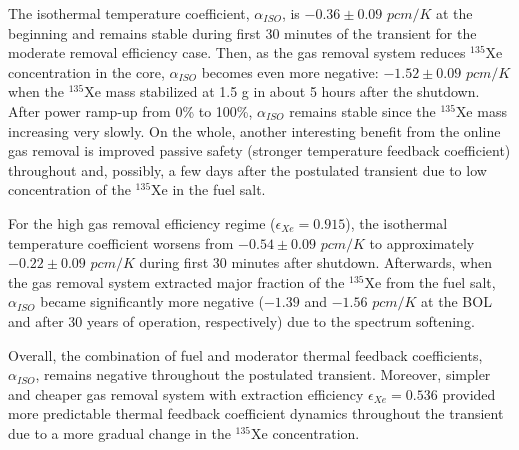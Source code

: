The isothermal temperature coefficient, $\alpha_{ISO}$, is $-0.36\pm0.09$ 
$pcm/K$ at the beginning and remains stable during first 30 minutes of the 
transient for the moderate removal efficiency case.  Then, as the gas removal 
system reduces $^{135}$Xe concentration in the core, $\alpha_{ISO}$ becomes 
even more negative: $-1.52\pm0.09$ $pcm/K$ when the $^{135}$Xe mass stabilized 
at 1.5 g in about 5 hours after the shutdown. After power ramp-up from 0\% to 
100\%, $\alpha_{ISO}$ remains stable since the $^{135}$Xe mass increasing very 
slowly. On the whole, another interesting benefit from the online gas removal 
is improved passive safety (stronger temperature feedback coefficient) 
throughout and, possibly, a few days after the postulated transient due to low 
concentration of the $^{135}$Xe in the fuel salt.

For the high gas removal efficiency regime ($\epsilon_{Xe}=0.915$), the 
isothermal temperature coefficient worsens from $-0.54\pm0.09$ $pcm/K$ to 
approximately $-0.22\pm0.09$ $pcm/K$ during first 30 minutes after shutdown. 
Afterwards, when the gas removal system extracted major fraction of the 
$^{135}$Xe from the fuel salt, $\alpha_{ISO}$ became significantly more 
negative ($-1.39$ and $-1.56$ $pcm/K$ at the \gls{BOL} and after 30 years of 
operation, respectively) due to the spectrum softening.

Overall, the combination of fuel and moderator thermal feedback coefficients, 
$\alpha_{ISO}$, remains negative throughout the postulated transient. 
Moreover, simpler and cheaper gas removal system with extraction 
efficiency $\epsilon_{Xe}=0.536$ provided more predictable thermal feedback 
coefficient dynamics throughout the transient due to 
a more gradual change in the $^{135}$Xe concentration.

